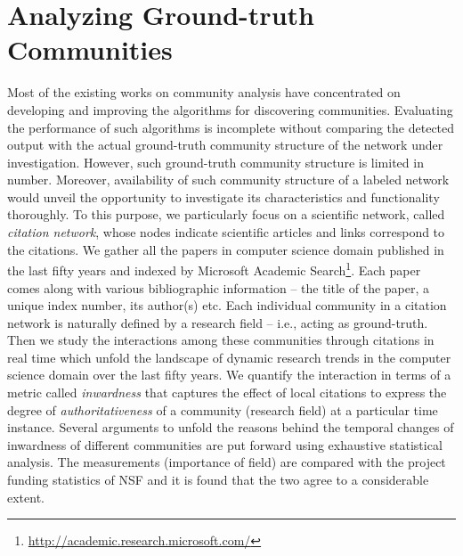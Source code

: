\section{Analyzing Ground-truth Communities}
Most of the existing works on community analysis have concentrated on developing and improving the algorithms for discovering communities.
Evaluating the performance of such algorithms is incomplete without comparing the detected output with the actual ground-truth community
structure of the network under investigation. However, such ground-truth community structure is limited in number. 
Moreover, availability of such community structure of a labeled network  would unveil the opportunity to investigate its 
characteristics and functionality thoroughly. To this purpose, we particularly focus on a scientific network, called {\em
citation network}, whose nodes indicate scientific articles and links correspond to the citations. We gather all the papers in computer
science domain published in the last fifty years and indexed by Microsoft Academic
Search\footnote{\url{http://academic.research.microsoft.com/}}.
Each paper comes along with various bibliographic information -- the title of the paper, a unique index number, its author(s) etc.
Each individual community in a citation network is naturally defined by a research field -- i.e., acting as ground-truth. Then we study
the interactions among these communities through citations in real time which unfold the landscape of dynamic research trends in the
computer science domain over the last fifty years. We quantify the interaction in terms of a metric called {\em inwardness} that
captures the effect of local citations to express the degree of {\em authoritativeness} of a community (research field) at a particular time
instance. Several arguments to unfold the reasons behind the temporal changes of inwardness of different communities are put forward using
exhaustive statistical analysis. The measurements (importance of field) are compared with the project funding statistics of
NSF and it is found that the two agree to a considerable extent.

